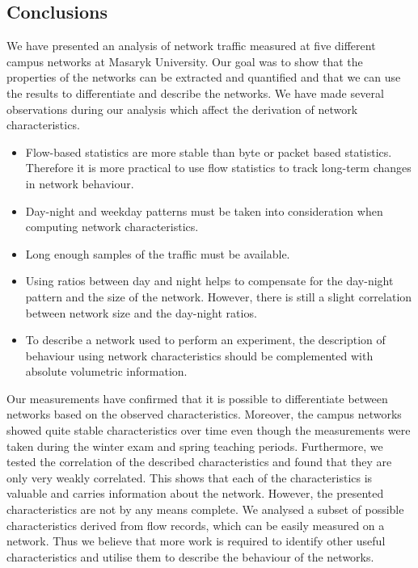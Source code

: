 \subsection{Conclusions} \label{subsec:characterization-conclusions}

We have presented an analysis of network traffic measured at five different campus networks at Masaryk University. Our goal was to show that the properties of the networks can be extracted and quantified and that we can use the results to differentiate and describe the networks. We have made several observations during our analysis which affect the derivation of network characteristics.

\begin{itemize}
    \setlength\itemsep{4pt}
    \item Flow-based statistics are more stable than byte or packet based statistics. Therefore it is more practical to use flow statistics to track long-term changes in network behaviour.
    \item Day-night and weekday patterns must be taken into consideration when computing network characteristics.
    \item Long enough samples of the traffic must be available.
    \item Using ratios between day and night helps to compensate for the day-night pattern and the size of the network. However, there is still a slight correlation between network size and the day-night ratios.
    \item To describe a network used to perform an experiment, the description of behaviour using network characteristics should be complemented with absolute volumetric information.
\end{itemize}

Our measurements have confirmed that it is possible to differentiate between networks based on the observed characteristics. Moreover, the campus networks showed quite stable characteristics over time even though the measurements were taken during the winter exam and spring teaching periods. Furthermore, we tested the correlation of the described characteristics and found that they are only very weakly correlated. This shows that each of the characteristics is valuable and carries information about the network. However, the presented characteristics are not by any means complete. We analysed a subset of possible characteristics derived from flow records, which can be easily measured on a network. Thus we believe that more work is required to identify other useful characteristics and utilise them to describe the behaviour of the networks.


